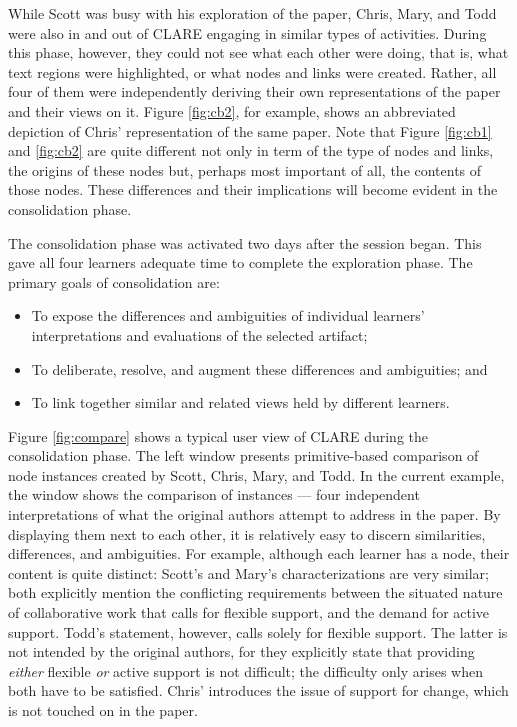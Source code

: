 While Scott was busy with his exploration of the paper, Chris, Mary, and
Todd were also in and out of CLARE engaging in similar types of activities.
During this phase, however, they could not see what each other were doing,
that is, what text regions were highlighted, or what nodes and links were
created. Rather, all four of them were independently deriving their own
representations of the paper and their views on it. Figure \ref{fig:cb2},
for example, shows an abbreviated depiction of Chris' representation of the
same paper. Note that Figure \ref{fig:cb1} and \ref{fig:cb2} are quite
different not only in term of the type of nodes and links, the origins of
these nodes but, perhaps most important of all, the contents of those
nodes. These differences and their implications will become evident in the
consolidation phase.

The consolidation phase was activated two days after the session began.
This gave all four learners adequate time to complete the exploration
phase. The primary goals of consolidation are:

\begin{itemize}
\item To expose the differences and ambiguities of individual learners'
  interpretations and evaluations of the selected artifact;
  
\item To deliberate, resolve, and augment these differences and
  ambiguities; and
  
\item To link together similar and related views held by different
  learners.
\end{itemize}

Figure \ref{fig:compare} shows a typical user view of CLARE during the
consolidation phase. The left window presents primitive-based comparison of
node instances created by Scott, Chris, Mary, and Todd. In the current
example, the window shows the comparison of  instances
--- four independent interpretations of what the original authors attempt
to address in the paper. By displaying them next to each other, it is
relatively easy to discern similarities, differences, and ambiguities. For
example, although each learner has a  node, their
content is quite distinct: Scott's and Mary's characterizations are very
similar; both explicitly mention the conflicting requirements between the
situated nature of collaborative work that calls for flexible support, and
the demand for active support. Todd's statement, however, calls solely for
flexible support. The latter is not intended by the original authors, for
they explicitly state that providing {\it either\/} flexible {\it or\/}
active support is not difficult; the difficulty only arises when both have
to be satisfied. Chris'  introduces the issue of
support for change, which is not touched on in the paper.


